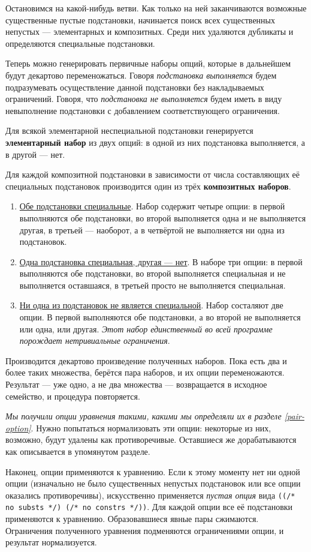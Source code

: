 \documentclass[12pt]{article}
\begin{document}
Остановимся на какой-нибудь ветви. Как только на ней заканчиваются возможные
существенные пустые подстановки, начинается поиск всех существенных непустых
--- элементарных и композитных. Среди них удаляются дубликаты и определяются
специальные подстановки.

Теперь можно генерировать первичные наборы опций, которые в дальнейшем будут
декартово переменожаться. Говоря \textit{подстановка выполняется} будем
подразумевать осуществление данной подстановки без накладываемых ограничений.
Говоря, что \textit{подстановка не выполняется} будем иметь в виду невыполнение
подстановки с добавлением соответствующего ограничения.

Для всякой элементарной неспециальной подстановки генерируется
\textbf{элементарный набор} из двух опций: в одной из них подстановка
выполняется, а в другой --- нет.

Для каждой композитной подстановки в зависимости от числа составляющих её
специальных подстановок производится один из трёх \textbf{композитных наборов}.
\begin{enumerate}
  \item \underline{Обе подстановки специальные}. Набор содержит четыре опции:
  в первой выполняются обе подстановки, во второй выполняется одна и не
  выполняется другая, в третьей --- наоборот, а в четвёртой не выполняется
  ни одна из подстановок.
  
  \item \underline{Одна подстановка специальная, другая --- нет}. В наборе
  три опции: в первой выполняются обе подстановки, во второй выполняется
  специальная и не выполняется оставшаяся, в третьей просто не выполняется
  специальная.
    
  \item \underline{Ни одна из подстановок не является специальной}. Набор
  состаляют две опции. В первой выполняются обе подстановки, а во второй не
  выполняется или одна, или другая. \textit{Этот набор единственный во
  всей программе порождает нетривиальные ограничения}.
\end{enumerate}

Производится декартово произведение полученных наборов. Пока есть два и более
таких множества, берётся пара наборов, и их опции переменожаются. Результат
--- уже одно, а не два множества --- возвращается в исходное семейство, и
процедура повторяется.

\textit{Мы получили опции уравнения такими, какими мы определяли их в разделе
\emph{\ref{pair-option}}}. Нужно попытаться нормализовать эти опции: некоторые
из них, возможно, будут удалены как противоречивые. Оставшиеся же
дорабатываются как описывается в упомянутом разделе.

Наконец, опции применяются к уравнению. Если к этому моменту нет ни одной опции
(изначально не было существенных непустых подстановок или все опции оказались
противоречивы), искусственно применяется \textit{пустая опция} вида
\texttt{((/* no substs */) (/* no constrs */))}. Для каждой опции все её
подстановки применяются к уравнению. Образовавшиеся явные пары сжимаются.
Ограничения полученного уравнения подменяются ограничениями опции, и результат
нормализуется.
\end{document}

